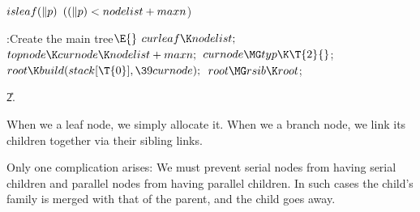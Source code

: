 \Y\B\4\D$\\{isleaf}(\|p)$ \5
$((\|p)<\\{nodelist}+\\{maxn}{}$)\par
\Y\B\4:Create the main tree\X${}\E{}$\6
$\\{curleaf}\K\\{nodelist};{}$\6
${}\\{topnode}\K\\{curnode}\K\\{nodelist}+\\{maxn};{}$\6
${}\\{curnode}\MG\\{typ}\K\T{2}{}$;\6
${}\\{root}\K\\{build}(\\{stack}[\T{0}],\39\\{curnode});{}$\6
${}\\{root}\MG\\{rsib}\K\\{root}{}$;\par
\U2.\fi

When we  a leaf node, we simply allocate it. When we
 a branch node, we link its children together via their
sibling links.

Only one complication arises: We must prevent serial nodes
from having serial children and parallel nodes from having parallel
children. In such cases the child's family is merged with that of
the parent, and the child goes away.


